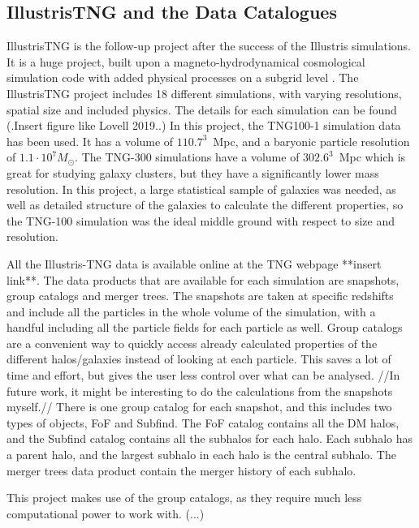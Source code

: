 \subsection{IllustrisTNG and the Data Catalogues}
IllustrisTNG is the follow-up project after the success of the Illustris simulations. It is a huge project, built upon a magneto-hydrodynamical cosmological simulation code with added physical processes on a subgrid level \parencite{Weinberger2016}. The IllustrisTNG project includes 18 different simulations, with varying resolutions, spatial size and included physics. The details for each simulation can be found (.Insert figure like Lovell 2019..) In this project, the TNG100-1 simulation data has been used. It has a volume of $110.7^3 \,$ Mpc, and a baryonic particle resolution of $1.1 \cdot 10^7 M_{\odot}$. The TNG-300 simulations have a volume of $302.6^3 \,$ Mpc which is great for studying galaxy clusters, but they have a significantly lower mass resolution. In this project, a large statistical sample of galaxies was needed, as well as detailed structure of the galaxies to calculate the different properties, so the TNG-100 simulation was the ideal middle ground with respect to size and resolution.

All the Illustris-TNG data is available online at the TNG webpage **insert link**. The data products that are available for each simulation are snapshots, group catalogs and merger trees. The snapshots are taken at specific redshifts and include all the particles in the whole volume of the simulation, with a handful including all the particle fields for each particle as well. Group catalogs are a convenient way to quickly access already calculated properties of the different halos/galaxies instead of looking at each particle. This saves a lot of time and effort, but gives the user less control over what can be analysed. //In future work, it might be interesting to do the calculations from the snapshots myself.// There is one group catalog for each snapshot, and this includes two types of objects, FoF and Subfind. The FoF catalog contains all the DM halos, and the Subfind catalog contains all the subhalos for each halo. Each subhalo has a parent halo, and the largest subhalo in each halo is the central subhalo. The merger trees data product contain the merger history of each subhalo.

This project makes use of the group catalogs, as they require much less computational power to work with. (...)


